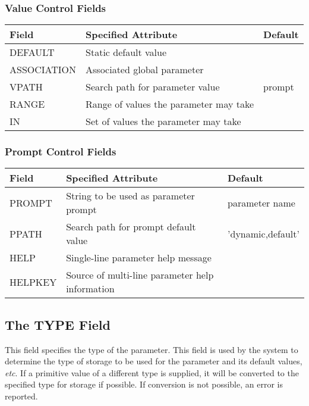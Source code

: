 \documentclass[twoside,11pt]{article}
\newcommand{\xlabel}[1]{}
\renewcommand{\_}{\texttt{\symbol{95}}}
\begin{document}
\subsubsection*{Value Control Fields}
\begin{center}
\begin{tabular}{|l|l|l|} \hline
Field & Specified Attribute & Default\\
\hline
DEFAULT & Static default value & \\
ASSOCIATION & Associated global parameter & \\
VPATH & Search path for parameter value & prompt\\
RANGE & Range of values the parameter may take & \\
IN & Set of values the parameter may take & \\
\hline
\end{tabular}
\end{center}

\subsubsection*{Prompt Control Fields}
\begin{center}
\begin{tabular}{|l|l|l|} \hline
Field & Specified Attribute & Default\\
\hline
PROMPT & String to be used as parameter prompt & parameter
name \\ 
PPATH & Search path for prompt default value & 'dynamic,default' \\
HELP & Single-line parameter help message & \\
HELPKEY & Source of multi-line parameter help information & \\
\hline
\end{tabular}
\end{center}

\subsection{The TYPE Field
\xlabel{the_type_field}\label{type}}

This field specifies the type of the parameter. 
This field is used by the system to determine the type of storage to be
used for the parameter and its default values, {\em etc}. 
If a primitive value of a different type is supplied,
it will be converted to the specified type for storage if possible. 
If conversion is not possible, an error is reported.
\end{document}
